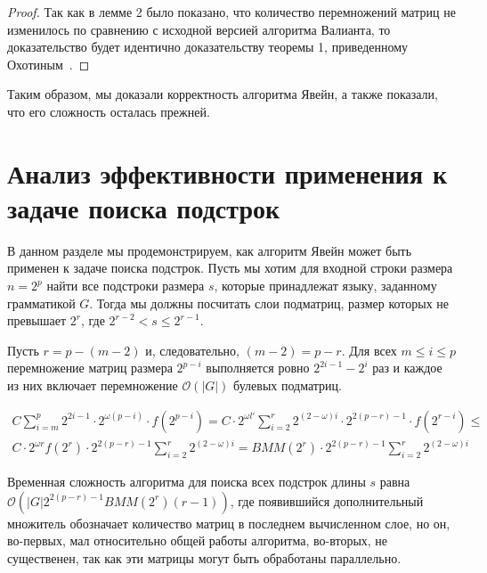 \documentclass[14pt]{matmex-diploma-custom}
\begin{document}
\begin{proof}
Так как в лемме 2 было показано, что количество перемножений матриц не изменилось по сравнению с исходной версией алгоритма Валианта, то доказательство будет идентично доказательству теоремы 1, приведенному Охотиным~\cite{Okhotin:2014:PMM:2565359.2565379}.
\end{proof}

Таким образом, мы доказали корректность алгоритма Явейн, а также показали, что его сложность осталась прежней.


\section{Анализ эффективности применения к задаче поиска подстрок}

В данном разделе мы продемонстрируем, как алгоритм Явейн может быть применен к задаче поиска подстрок.
Пусть мы хотим для входной строки размера $n = 2^p$ найти все подстроки размера $s$, которые принадлежат языку, заданному грамматикой $G$.
Тогда мы должны посчитать слои подматриц, размер которых не превышает $2^{r}$, где $2^{r - 2} < s \le 2^{r - 1}$.

Пусть $r = p - (m - 2)$ и, следовательно, $(m - 2) = p - r$.
Для всех  $m \le i \le p$ перемножение матриц размера $2^{p - i}$ выполняется ровно $2^{2i - 1} - 2^{i}$ раз и каждое из них включает перемножение $\mathcal{O}(|G|)$ булевых подматриц.

\begin{equation*}
\begin{array}{c}
C \sum\limits_{i=m}^p 2^{2i - 1} \cdot 2^{\omega(p - i)} \cdot f(2^{p - i}) =
C \cdot 2^{\omega l'}\sum\limits_{i=2}^{r} 2^{(2 - \omega)i} \cdot 2^{2(p - r) - 1} \cdot f(2^{r - i}) \le \\
C \cdot 2^{\omega r} f(2^{r}) \cdot 2^{2(p - r) - 1} \sum\limits_{i=2}^{r} 2^{(2 - \omega)i} =
BMM(2^{r}) \cdot 2^{2(p - r) - 1} \sum\limits_{i=2}^{r} 2^{(2 - \omega)i}
\end{array}
\end{equation*}

Временная сложность алгоритма для поиска всех подстрок длины $s$ равна $\mathcal{O}(|G|2^{2(p - r) - 1}BMM(2^{r})(r - 1))$, где появившийся дополнительный множитель обозначает количество матриц в последнем вычисленном слое, но он, во-первых, мал относительно общей работы алгоритма, во-вторых, не существенен, так как эти матрицы могут быть обработаны параллельно. 
\end{document}
